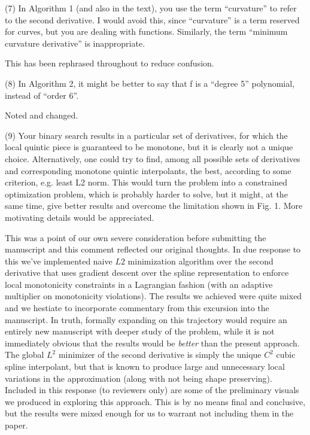 \goodbreak
{\parindent=20pt \it
  
\item{(7)} In Algorithm 1 (and also in the text), you use the term
  ``curvature'' to refer to the second derivative. I would avoid this,
  since ``curvature'' is a term reserved for curves, but you are dealing
  with functions. Similarly, the term ``minimum curvature derivative''
  is inappropriate.

}

This has been rephrased throughout to reduce confusion.


\goodbreak
{\parindent=20pt \it
  
\item{(8)} In Algorithm 2, it might be better to say that f is a
  ``degree 5'' polynomial, instead of ``order 6''.

}

Noted and changed.

{\parindent=20pt \it
  
\item{(9)} Your binary search results in a particular set of
  derivatives, for which the local quintic piece is guaranteed to be
  monotone, but it is clearly not a unique choice. Alternatively, one
  could try to find, among all possible sets of derivatives and
  corresponding monotone quintic interpolants, the best, according to
  some criterion, e.g. least L2 norm. This would turn the problem into
  a constrained optimization problem, which is probably harder to
  solve, but it might, at the same time, give better results and
  overcome the limitation shown in Fig. 1. More motivating details
  would be appreciated.

}

This was a point of our own severe consideration before submitting the
manuscript and this comment reflected our original thoughts. In due
response to this we've implemented naive $L2$ minimization algorithm
over the second derivative that uses gradient descent over the spline
representation to enforce local monotonicity constraints in a
Lagrangian fashion (with an adaptive multiplier on monotonicity
violations). The results we achieved were quite mixed and we hestiate
to incorporate commentary from this excursion into the manuscript. In
truth, formally expanding on this trajectory would require an entirely
new manuscript with deeper study of the problem, while it is not
immediately obvious that the results would be {\it better} than the
present approach. The global $L^2$ minimizer of the second derivative
is simply the unique $C^2$ cubic spline interpolant, but that is known
to produce large and unnecessary local variations in the approximation
(along with not being shape preserving). Included in this response (to
reviewers only) are some of the preliminary visuals we produced in
exploring this approach. This is by no means final and conclusive, but
the results were mixed enough for us to warrant not including them in
the paper.


